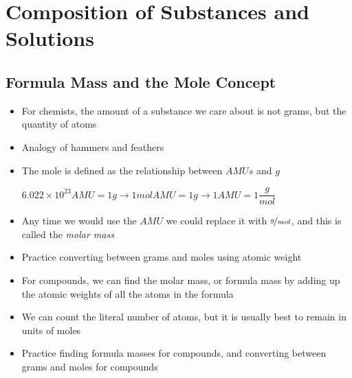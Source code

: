 \documentclass[12pt, openany, letterpaper]{memoir}
\begin{document}
\chapter{Composition of Substances and Solutions}

\section{Formula Mass and the Mole Concept}
\begin{itemize}
  \item For chemists, the amount of a substance we care about is not grams, but the quantity of atoms
  \item Analogy of hammers and feathers
  \item The mole is defined as the relationship between $AMUs$ and $g$

    $6.022\times10^{23}AMU=1g \longrightarrow 1molAMU=1g \longrightarrow 1AMU=1\dfrac{g}{mol}$
  \item Any time we would use the $AMU$ we could replace it with $\nicefrac{g}{mol}$, and this is called the \emph{molar mass}
  \item Practice converting between grams and moles using atomic weight
  \item For compounds, we can find the molar mass, or formula mass by adding up the atomic weights of all the atoms in the formula
  \item We can count the literal number of atoms, but it is usually best to remain in units of moles
  \item Practice finding formula masses for compounds, and converting between grams and moles for compounds
\end{itemize}
\end{document}
